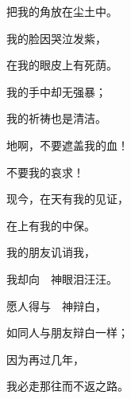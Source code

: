 {\par }{\Q 把我的角放在尘土中。
\par }{\Q {}我的脸因哭泣发紫，
\par }{\Q 在我的眼皮上有死荫。
\par }{\Q {}我的手中却无强暴；
\par }{\Q 我的祈祷也是清洁。
\par }{\BB \par }{\Q {}地啊，不要遮盖我的血！
\par }{\Q 不要{}我的哀求！
\par }{\Q {}现今，在天有我的见证，
\par }{\Q 在上有我的中保。
\par }{\Q {}我的朋友讥诮我，
\par }{\Q 我却向　神眼泪汪汪。
\par }{\Q {}愿人得与　神辩白，
\par }{\Q 如同人与朋友辩白一样；
\par }{\Q {}因为再过几年，
\par }{\Q 我必走那往而不返之路。

}

